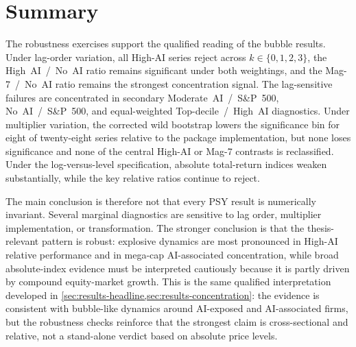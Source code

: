 \section{Summary}
\label{sec:rob-psy}

The robustness exercises support the qualified reading of the bubble results. Under lag-order variation, all High-AI series reject across $k\in\{0,1,2,3\}$, the High~AI~/~No~AI ratio remains significant under both weightings, and the Mag-7~/~No~AI ratio remains the strongest concentration signal. The lag-sensitive failures are concentrated in secondary Moderate~AI~/~S\&P~500, No~AI~/~S\&P~500, and equal-weighted Top-decile~/~High~AI diagnostics. Under multiplier variation, the corrected wild bootstrap lowers the significance bin for eight of twenty-eight series relative to the package implementation, but none loses significance and none of the central High-AI or Mag-7 contrasts is reclassified. Under the log-versus-level specification, absolute total-return indices weaken substantially, while the key relative ratios continue to reject.

The main conclusion is therefore not that every PSY result is numerically invariant. Several marginal diagnostics are sensitive to lag order, multiplier implementation, or transformation. The stronger conclusion is that the thesis-relevant pattern is robust: explosive dynamics are most pronounced in High-AI relative performance and in mega-cap AI-associated concentration, while broad absolute-index evidence must be interpreted cautiously because it is partly driven by compound equity-market growth. This is the same qualified interpretation developed in \cref{sec:results-headline,sec:results-concentration}: the evidence is consistent with bubble-like dynamics around AI-exposed and AI-associated firms, but the robustness checks reinforce that the strongest claim is cross-sectional and relative, not a stand-alone verdict based on absolute price levels.
